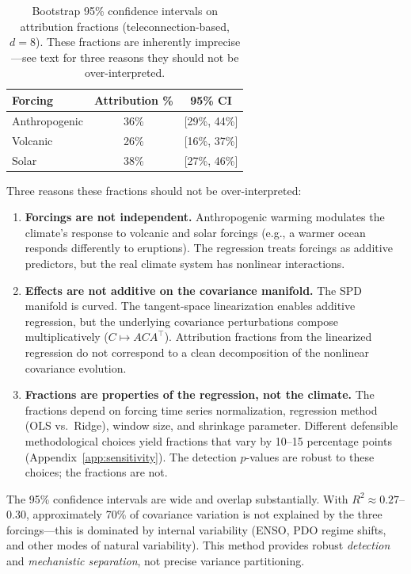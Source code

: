 \documentclass[preprint,12pt]{elsarticle}
\begin{document}
\begin{table}[t]
\centering
\caption{Bootstrap 95\% confidence intervals on attribution fractions (teleconnection-based, $d=8$). These fractions are inherently imprecise---see text for three reasons they should not be over-interpreted.}
\label{tab:attribution}
\begin{tabular}{lcc}
\toprule
Forcing & Attribution \% & 95\% CI \\
\midrule
Anthropogenic & 36\% & [29\%, 44\%] \\
Volcanic & 26\% & [16\%, 37\%] \\
Solar & 38\% & [27\%, 46\%] \\
\bottomrule
\end{tabular}
\end{table}

Three reasons these fractions should not be over-interpreted:

\begin{enumerate}
\item \textbf{Forcings are not independent.} Anthropogenic warming modulates the climate's response to volcanic and solar forcings (e.g., a warmer ocean responds differently to eruptions).
The regression treats forcings as additive predictors, but the real climate system has nonlinear interactions.

\item \textbf{Effects are not additive on the covariance manifold.} The SPD manifold is curved.
The tangent-space linearization enables additive regression, but the underlying covariance perturbations compose multiplicatively ($C \mapsto A C A^\top$).
Attribution fractions from the linearized regression do not correspond to a clean decomposition of the nonlinear covariance evolution.

\item \textbf{Fractions are properties of the regression, not the climate.} The fractions depend on forcing time series normalization, regression method (OLS vs.\ Ridge), window size, and shrinkage parameter.
Different defensible methodological choices yield fractions that vary by 10--15 percentage points (Appendix~\ref{app:sensitivity}).
The detection $p$-values are robust to these choices; the fractions are not.
\end{enumerate}

The 95\% confidence intervals are wide and overlap substantially.
With $R^2 \approx 0.27$--$0.30$, approximately 70\% of covariance variation is not explained by the three forcings---this is dominated by internal variability (ENSO, PDO regime shifts, and other modes of natural variability).
This method provides robust \emph{detection} and \emph{mechanistic separation}, not precise variance partitioning.
\end{document}
